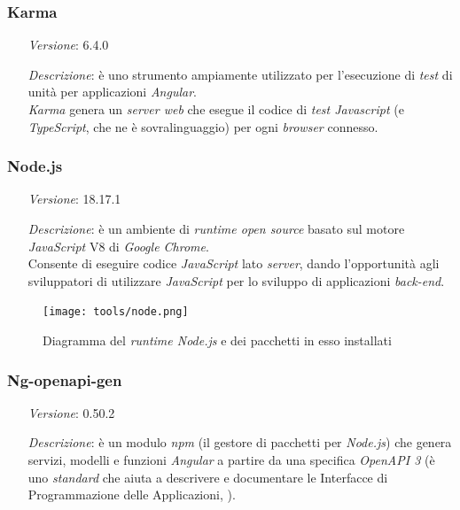     \subsubsection*{Karma} %
    \begin{itemize}[align=left]
        \item [\textit{Versione}:] 6.4.0
        \item [\textit{Descrizione}:] è uno strumento ampiamente utilizzato per l'esecuzione di \textit{test} di unità per applicazioni \textit{Angular}. \\
                    \textit{Karma} genera un \textit{server web} che esegue il codice di \textit{test Javascript} (e \textit{TypeScript}, che ne è sovralinguaggio) per ogni \textit{browser} connesso.
    \end{itemize}

    \subsubsection*{Node.js} %
    \begin{itemize}[align=left]
        \item [\textit{Versione}:] 18.17.1
        \item [\textit{Descrizione}:] è un ambiente di \textit{runtime open source} basato sul motore \textit{JavaScript} V8 di \textit{Google Chrome}. \\
                    Consente di eseguire codice \textit{JavaScript} lato \textit{server}, dando l'opportunità agli sviluppatori di utilizzare \textit{JavaScript} per lo sviluppo di applicazioni \textit{back-end}.
    \end{itemize}

    \begin{figure}[H]
      \centering
      \texttt{[image: tools/node.png]}
      \caption{Diagramma del \textit{runtime Node.js} e dei pacchetti in esso installati}
    \end{figure}

    \subsubsection*{Ng-openapi-gen} %
    \begin{itemize}[align=left]
        \item [\textit{Versione}:] 0.50.2
        \item [\textit{Descrizione}:] è un modulo \textit{npm} (il gestore di pacchetti per \textit{Node.js}) che genera servizi,
                    modelli e funzioni \textit{Angular} a partire da una specifica \textit{OpenAPI 3} (è uno \textit{standard} che aiuta a descrivere e documentare le Interfacce di Programmazione delle Applicazioni, ).
    \end{itemize}

